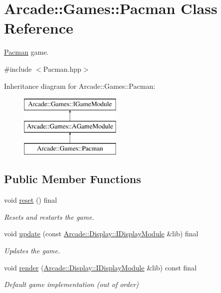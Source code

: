\hypertarget{classArcade_1_1Games_1_1Pacman}{}\section{Arcade\+::Games\+::Pacman Class Reference}
\label{classArcade_1_1Games_1_1Pacman}


\mbox{\hyperlink{classArcade_1_1Games_1_1Pacman}{Pacman}} game.  




{\ttfamily \#include $<$Pacman.\+hpp$>$}

Inheritance diagram for Arcade\+::Games\+::Pacman\+:\begin{figure}[H]
\begin{center}
\leavevmode
\includegraphics[height=3.000000cm]{classArcade_1_1Games_1_1Pacman}
\end{center}
\end{figure}
\subsection*{Public Member Functions}
\begin{DoxyCompactItemize}
\item 
\mbox{\label{classArcade_1_1Games_1_1Pacman_ab22a7f3125e07169dc326eb3b89dba94}} 
void \mbox{\hyperlink{classArcade_1_1Games_1_1Pacman_ab22a7f3125e07169dc326eb3b89dba94}{reset}} () final
\begin{DoxyCompactList}\small\item\em Resets and restarts the game. \end{DoxyCompactList}\item 
void \mbox{\hyperlink{classArcade_1_1Games_1_1Pacman_aa6bc227c3f14cc8d66d11f2d32bed3ec}{update}} (const \mbox{\hyperlink{classArcade_1_1Display_1_1IDisplayModule}{Arcade\+::\+Display\+::\+I\+Display\+Module}} \&lib) final
\begin{DoxyCompactList}\small\item\em Updates the game. \end{DoxyCompactList}\item 
void \mbox{\hyperlink{classArcade_1_1Games_1_1Pacman_ab1a7408f265efbef12b4f9d1a6fb4512}{render}} (\mbox{\hyperlink{classArcade_1_1Display_1_1IDisplayModule}{Arcade\+::\+Display\+::\+I\+Display\+Module}} \&lib) const final
\begin{DoxyCompactList}\small\item\em Default game implementation (out of order) \end{DoxyCompactList}\end{DoxyCompactItemize}
